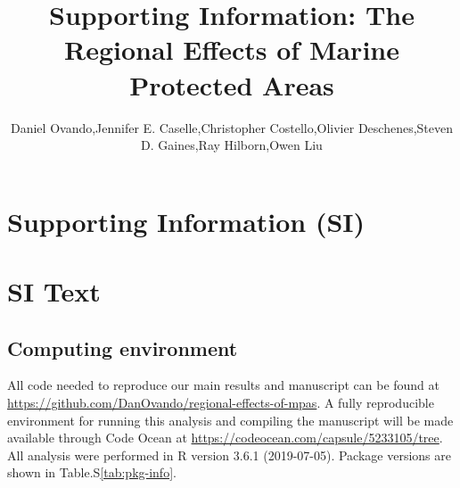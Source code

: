 \documentclass[]{article}
\title{Supporting Information: The Regional Effects of Marine Protected Areas}
\author{Daniel Ovando,Jennifer E. Caselle,Christopher Costello,Olivier Deschenes,Steven D. Gaines,Ray Hilborn,Owen Liu}
\date{}
\begin{document}
\maketitle

{
\setcounter{tocdepth}{2}
\tableofcontents
}
\hypertarget{supporting-information-si}{%
\section{Supporting Information (SI)}\label{supporting-information-si}}

\hypertarget{si-text}{%
\section*{SI Text}\label{si-text}}

\hypertarget{computing-environment}{%
\subsection{Computing environment}\label{computing-environment}}

All code needed to reproduce our main results and manuscript can be found at \url{https://github.com/DanOvando/regional-effects-of-mpas}. A fully reproducible environment for running this analysis and compiling the manuscript will be made available through Code Ocean at \url{https://codeocean.com/capsule/5233105/tree}. All analysis were performed in R version 3.6.1 (2019-07-05). Package versions are shown in Table.S\ref{tab:pkg-info}.
\end{document}
